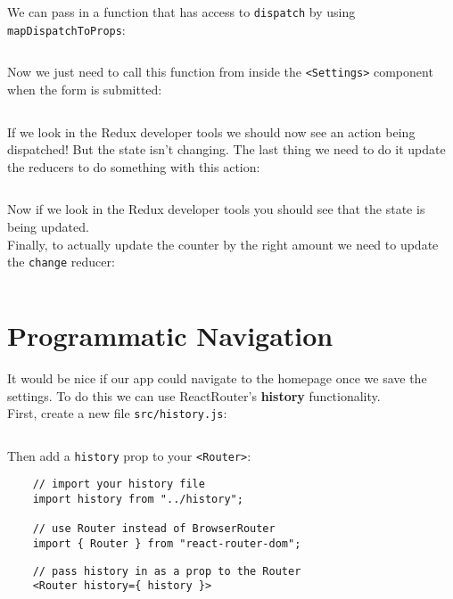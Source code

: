 We can pass in a function that has access to \texttt{dispatch} by using \texttt{mapDispatchToProps}:

\inputminted{js}{03/figures/07-Settings.js}

Now we just need to call this function from inside the \texttt{<Settings>} component when the form is submitted:

\inputminted{js}{03/figures/08-Settings.jsx}

If we look in the Redux developer tools we should now see an action being dispatched! But the state isn't changing. The last thing we need to do it update the reducers to do something with this action:

\inputminted{js}{03/figures/09-reducers.js}

Now if we look in the Redux developer tools you should see that the state is being updated.
\\

Finally, to actually update the counter by the right amount we need to update the \texttt{change} reducer:

\inputminted{js}{03/figures/10-change.js}





\section{Programmatic Navigation}

It would be nice if our app could navigate to the homepage once we save the settings. To do this we can use ReactRouter's \textbf{history} functionality.
\\

First, create a new file \texttt{src/history.js}:

\inputminted{js}{03/figures/11-history.js}

Then add a \texttt{history} prop to your \texttt{<Router>}:

\begin{verbatim}
    // import your history file
    import history from "../history";

    // use Router instead of BrowserRouter
    import { Router } from "react-router-dom";
\end{verbatim}

\begin{verbatim}
    // pass history in as a prop to the Router
    <Router history={ history }>
\end{verbatim}

